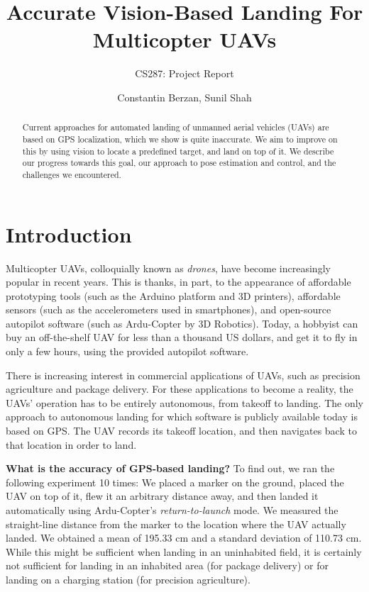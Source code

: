 \documentclass[10pt]{scrartcl} %
\title{Accurate Vision-Based Landing For Multicopter UAVs}
\subtitle{CS287: Project Report}
\author{Constantin Berzan, Sunil Shah}
\date{}
\begin{document}
\maketitle

\begin{abstract}
Current approaches for automated landing of unmanned aerial vehicles (UAVs) are
based on GPS localization, which we show is quite inaccurate. We aim to improve
on this by using vision to locate a predefined target, and land on top of it.
We describe our progress towards this goal, our approach to pose estimation and
control, and the challenges we encountered.
\end{abstract}

\section{Introduction}

Multicopter UAVs, colloquially known as \textit{drones}, have become
increasingly popular in recent years. This is thanks, in part, to the
appearance of affordable prototyping tools (such as the Arduino platform and 3D
printers), affordable sensors (such as the accelerometers used in smartphones),
and open-source autopilot software (such as Ardu-Copter by 3D Robotics). Today,
a hobbyist can buy an off-the-shelf UAV for less than a thousand US dollars,
and get it to fly in only a few hours, using the provided autopilot software.

There is increasing interest in commercial applications of UAVs, such as 
precision agriculture and package delivery. For these applications to become a 
reality, the UAVs' operation has to be entirely autonomous, from takeoff to 
landing. The only approach to autonomous landing for which software is publicly 
available today is based on GPS. The UAV records its takeoff location, and then 
navigates back to that location in order to land.

{\bf What is the accuracy of GPS-based landing?} To find out, we ran the
following experiment 10 times: We placed a marker on the ground, placed the UAV
on top of it, flew it an arbitrary distance away, and then landed it
automatically using Ardu-Copter's \textit{return-to-launch} mode. We measured
the straight-line distance from the marker to the location where the UAV
actually landed. We obtained a mean of 195.33 cm and a standard deviation of
110.73 cm. While this might be sufficient when landing in an uninhabited field,
it is certainly not sufficient for landing in an inhabited area (for package
delivery) or for landing on a charging station (for precision agriculture).
\end{document}
